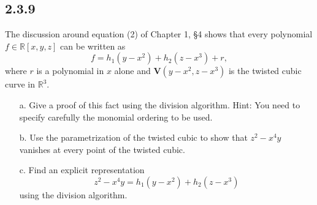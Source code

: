 \documentclass[]{article}
\newcommand\<{\langle}
\renewcommand\>{\rangle}
\newcommand{\RR}{\ensuremath{\mathbb{R}}}
\begin{document}
\subsection*{2.3.9} The discussion around equation (2) of Chapter 1, \S4 shows that every polynomial $f \in \RR[x,y,z]$ can be written as
$$
	f = h_1\left(y - x^2\right) + h_2\left(z-x^3\right) + r,
$$
where $r$ is a polynomial in $x$ alone and $\textbf{V}\left(y-x^2, z-x^3\right)$ is the twisted cubic curve in $\RR^3$.
\begin{enumerate}
	\item[a.] Give a proof of this fact using the division algorithm. Hint: You need to specify carefully the monomial ordering to be used. 
	\item[b.] Use the parametrization of the twisted cubic to show that $z^2 - x^4y$ vanishes at every point of the twisted cubic.
	\item[c.] Find an explicit representation 
	$$
		z^2 - x^4y = h_1\left(y - x^2\right) + h_2\left(z - x^3\right)
	$$
	using the division algorithm.
\end{enumerate}
\end{document}
